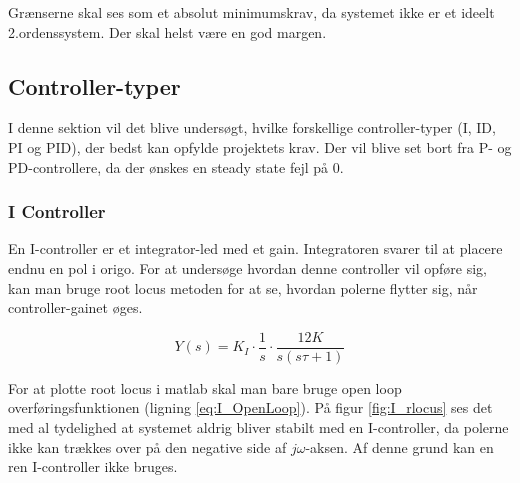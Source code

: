Grænserne skal ses som et absolut minimumskrav, da systemet ikke er et ideelt 2.ordenssystem. Der skal helst være en god margen.

\subsection{Controller-typer}

I denne sektion vil det blive undersøgt, hvilke forskellige controller-typer (I, ID, PI og PID), der bedst kan opfylde projektets krav. Der vil blive set bort fra P- og PD-controllere, da der ønskes en steady state fejl på 0. 

\subsubsection{I Controller}

En I-controller er et integrator-led med et gain. Integratoren svarer til at placere endnu en pol i origo. For at undersøge hvordan denne controller vil opføre sig, kan man bruge root locus metoden for at se, hvordan polerne flytter sig, når controller-gainet øges. 

\begin{equation}\label{eq:I_OpenLoop}
Y(s)=K_{I}\cdot\frac{1}{s}\cdot\frac{12K}{s(s\tau+1)}
\end{equation}

For at plotte root locus i matlab skal man bare bruge open loop overføringsfunktionen (ligning \ref{eq:I_OpenLoop}). På figur \ref{fig:I_rlocus} ses det med al tydelighed at systemet aldrig bliver stabilt med en I-controller, da polerne ikke kan trækkes over på den negative side af $j\omega$-aksen. Af denne grund kan en ren I-controller ikke bruges.

